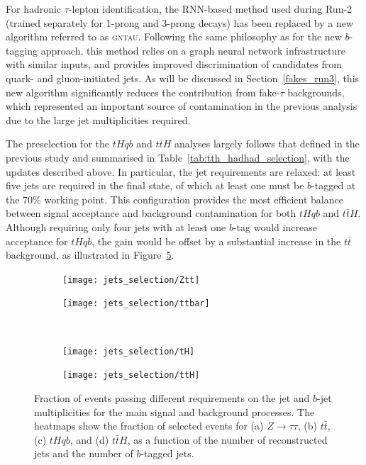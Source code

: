 For hadronic $\tau$-lepton identification, the RNN-based method used during Run-2 (trained separately for 1-prong and 3-prong decays) has been replaced by a new algorithm referred to as \textsc{gntau}. Following the same philosophy as for the new $b$-tagging approach, this method relies on a graph neural network infrastructure with similar inputs, and provides improved discrimination of \tauhadvis candidates from quark- and gluon-initiated jets. As will be discussed in Section~\ref{fakes_run3}, this new algorithm significantly reduces the contribution from fake-$\tau$ backgrounds, which represented an important source of contamination in the previous analysis due to the large jet multiplicities required.

The preselection for the $tHqb$ and $t\bar{t}H$ analyses largely follows that defined in the previous study and summarised in Table~\ref{tab:tth_hadhad_selection}, with the updates described above. In particular, the jet requirements are relaxed: at least five jets are required in the final state, of which at least one must be $b$-tagged at the 70\% working point. This configuration provides the most efficient balance between signal acceptance and background contamination for both $tHqb$ and $t\bar{t}H$. Although requiring only four jets with at least one $b$-tag would increase acceptance for $tHqb$, the gain would be offset by a substantial increase in the $t\bar{t}$ background, as illustrated in Figure~\ref{jets_selection}. 
\begin{figure}[htbp]
    \centering
    \begin{subfigure}[b]{0.45\textwidth}
      \centering
      \texttt{[image: jets\_selection/Ztt]}
      \caption{}
      \label{fig:jetsel_ztt}
    \end{subfigure}
    \hfill
    \begin{subfigure}[b]{0.45\textwidth}
      \centering
      \texttt{[image: jets\_selection/ttbar]}
      \caption{}
      \label{fig:jetsel_ttbar}
    \end{subfigure}
    \\[0.3cm]
    \begin{subfigure}[b]{0.45\textwidth}
      \centering
      \texttt{[image: jets\_selection/tH]}
      \caption{}
      \label{fig:jetsel_th}
    \end{subfigure}
    \hfill
    \begin{subfigure}[b]{0.45\textwidth}
      \centering
      \texttt{[image: jets\_selection/ttH]}
      \caption{}
      \label{fig:jetsel_tth}
    \end{subfigure}
    \caption{
      Fraction of events passing different requirements on the jet and $b$-jet multiplicities
      for the main signal and background processes. 
      The heatmaps show the fraction of selected events for (a) $Z\to\tau\tau$, (b) $t\bar{t}$, (c) $tHqb$, and (d) $t\bar{t}H$, 
      as a function of the number of reconstructed jets and the number of $b$-tagged jets.
    }
    \label{jets_selection}
  \end{figure}
  
